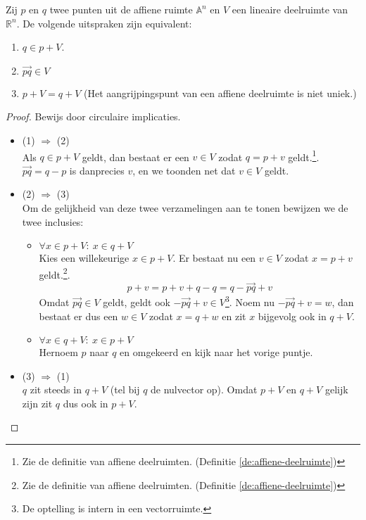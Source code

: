 \documentclass[main.tex]{subfiles}
\begin{document}
\begin{lem}
\label{lem:equivalenties-affiene-deelruimte}
  Zij $p$ en $q$ twee punten uit de affiene ruimte $\mathbb{A}^{n}$ en $V$ een lineaire deelruimte van $\mathbb{R}^{n}$. De volgende uitspraken zijn equivalent:
  \begin{enumerate}
  \item $q \in p+V$.
  \item $\overrightarrow{pq} \in V$
  \item $p + V = q + V$ (Het aangrijpingspunt van een affiene deelruimte is niet uniek.)
  \end{enumerate}

  \begin{proof}
    Bewijs door circulaire implicaties.
    \begin{itemize}
    \item (1) $\Rightarrow$ (2)\\
      Als $q \in p+V$ geldt, dan bestaat er een $v \in V$ zodat $q = p + v$ geldt.\footnote{Zie de definitie van affiene deelruimten. (Definitie \ref{de:affiene-deelruimte})}.
      $\overrightarrow{pq} = q - p$ is danprecies $v$, en we toonden net dat $v \in V$ geldt.
    \item (2) $\Rightarrow$ (3)\\
      Om de gelijkheid van deze twee verzamelingen aan te tonen bewijzen we de twee inclusies:
      \begin{itemize}
      \item $\forall x \in p + V:\ x \in q + V$\\
        Kies een willekeurige $x\in p + V$. Er bestaat nu een $v \in V$ zodat $x = p + v$ geldt.\footnote{Zie de definitie van affiene deelruimten. (Definitie \ref{de:affiene-deelruimte})}.
        \[ p + v = p + v + q - q = q - \overrightarrow{pq} + v\]
        Omdat $\overrightarrow{pq} \in V$ geldt, geldt ook $- \overrightarrow{pq} + v \in V$\footnote{De optelling is intern in een vectorruimte.}.
        Noem nu $- \overrightarrow{pq} + v = w$, dan bestaat er dus een $w \in V$ zodat $x = q + w$ en zit $x$ bijgevolg ook in $q + V$.
      \item $\forall x \in q + V:\ x \in p + V$\\
        Hernoem $p$ naar $q$ en omgekeerd en kijk naar het vorige puntje.
      \end{itemize}
    \item (3) $\Rightarrow$ (1)\\
      $q$ zit steeds in $q + V$ (tel bij $q$ de nulvector op).
      Omdat $p + V$ en $q + V$ gelijk zijn zit $q$ dus ook in $p + V$.
    \end{itemize}
  \end{proof}
\end{lem}
\end{document}
